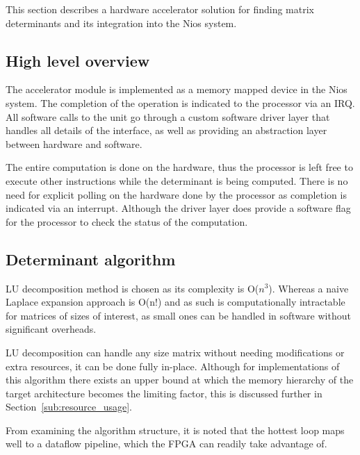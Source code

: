 \documentclass[]{article}
\begin{document}

This section describes a hardware accelerator solution for finding matrix determinants and its integration into the Nios system.

\subsection{High level overview} %
\label{sub:high_level_overview}

The accelerator module is implemented as a memory mapped device in the Nios system. The completion of the operation is indicated to the processor via an IRQ. All software calls to the unit go through a custom software driver layer that handles all details of the interface, as well as providing an abstraction layer between hardware and software. 

The entire computation is done on the hardware, thus the processor is left free to execute other instructions while the determinant is being computed. There is no need for explicit polling on the hardware done by the processor as completion is indicated via an interrupt. Although the driver layer does provide a software flag for the processor to check the status of the computation.

\subsection{Determinant algorithm} %
\label{sub:determinant_algortihm}

LU decomposition method is chosen as its complexity is O($n^3$). Whereas a naive Laplace expansion approach is O(n!) and as such is computationally intractable for matrices of sizes of interest, as small ones can be handled in software without significant overheads.

LU decomposition can handle any size matrix without needing modifications or extra resources, it can be done fully in-place. Although for implementations of this algorithm there exists an upper bound at which the memory hierarchy of the target architecture becomes the limiting factor, this is discussed further in Section~\ref{sub:resource_usage}.

From examining the algorithm structure, it is noted that the hottest loop maps well to a dataflow pipeline, which the FPGA can readily take advantage of.
\end{document}
